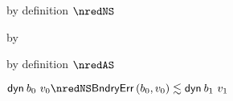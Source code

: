 {\begin{lamportproof*}
    \begin{pfproof}
        \begin{pfproof}
            \begin{pfproof}
              by definition $\nredNS$
            \end{pfproof}
            \begin{pfproof}
              by 
            \end{pfproof}
            \begin{pfproof}
              by definition $\nredAS$
            \end{pfproof}
          \qedstep
            \begin{pfproof}
              \begin{mathpar}
              \end{mathpar}
            \end{pfproof}
        \end{pfproof}
        \begin{pfproof}
          \qedstep
            \begin{pfproof}
              $\edynb{\sbnd_0}{\svalue_0} \nredNS \rexpr{\boundaryerror{\sbnd_0}{\svalue_0}}{\edynb{\sbnd_1}{\svalue_1}}$
            \end{pfproof}
        \end{pfproof}
    \end{pfproof}


\end{lamportproof*}}
